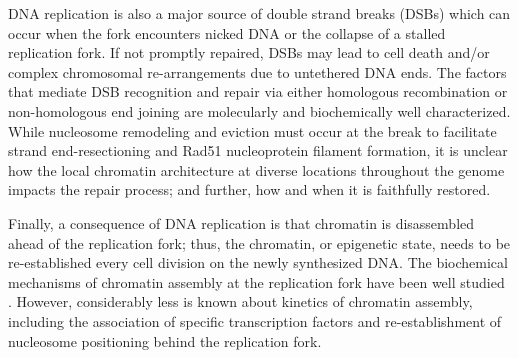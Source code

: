 DNA replication is also a major source of double strand breaks (DSBs) which can occur when the fork encounters nicked DNA or the collapse of a stalled replication fork\citep{Munoz2017-mi}.
If not promptly repaired, DSBs may lead to cell death and/or complex chromosomal re-arrangements due to untethered DNA ends\cite{Morgan1998}.  
The factors that mediate DSB recognition and repair via either homologous recombination or non-homologous end joining are molecularly and biochemically well characterized\cite{Symington2011}.
While nucleosome remodeling and eviction must occur at the break to facilitate strand end-resectioning and Rad51 nucleoprotein filament formation\cite{Renkawitz2014}, it is unclear how the local chromatin architecture at diverse locations throughout the genome impacts the repair process; and further, how and when it is faithfully restored.

Finally, a consequence of DNA replication is that chromatin is disassembled ahead of the replication fork; thus, the chromatin, or epigenetic state, needs to be re-established every cell division on the newly synthesized DNA\citep{MacAlpine2013-ds}.   The biochemical mechanisms of chromatin assembly at the replication fork have been well studied \invitro. However, considerably less is known about \invivo kinetics of chromatin assembly, including the association of specific transcription factors and re-establishment of nucleosome positioning behind the replication fork.  




